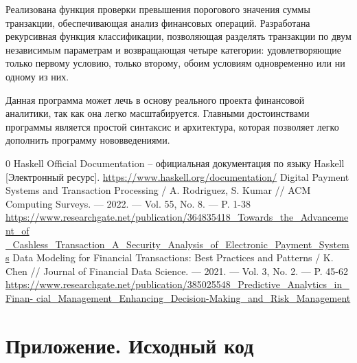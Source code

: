 \documentclass[a4paper, final]{article}
\begin{document}
	Реализована функция проверки превышения порогового значения суммы транзакции, обеспечивающая анализ финансовых операций. Разработана рекурсивная функция классификации, позволяющая разделять транзакции по двум независимым параметрам и возвращающая четыре категории: удовлетворяющие только первому условию, только второму, обоим условиям одновременно или ни одному из них.
	
	Данная программа может лечь в основу реального проекта финансовой аналитики, так как она легко масштабируется. Главными достоинствами программы является простой синтаксис и архитектура, которая позволяет легко дополнить  программу нововведениями.
	
	
	\newpage
	
	\vspace{-1.5cm}
	\begin{thebibliography}{0}
		Haskell Official Documentation -- официальная документация по языку Haskell [Электронный ресурс]. 	 
		\href {https://www.haskell.org/documentation/}{https://www.haskell.org/documentation/}
		Digital Payment Systems and Transaction Processing / A. Rodriguez, S. Kumar // ACM Computing Surveys. — 2022. — Vol. 55, No. 8. — P. 1-38
		\href {https://www.researchgate.net/publication/364835418_Towards_the_Advancement_of_Cashless_Transaction_A_Security_Analysis_of_Electronic_Payment_Systems}{https://www.researchgate.net/publication/364835418\_Towards\_the\_Advancement\_of
		\_Cashless\_Transaction\_A\_Security\_Analysis\_of\_Electronic\_Payment\_Systems}
		Data Modeling for Financial Transactions: Best Practices and Patterns / K. Chen // Journal of Financial Data Science. — 2021. — Vol. 3, No. 2. — P. 45-62	 
		\href {https://www.researchgate.net/publication/385025548_Predictive_Analytics_in_Financial_Management_Enhancing_Decision-Making_and_Risk_Management}{https://www.researchgate.net/publication/385025548\_Predictive\_Analytics\_in\_Finan-
		cial\_Management\_Enhancing\_Decision-Making\_and\_Risk\_Management}
		
	\end{thebibliography}
	
	\newpage
	\section*{Приложение. Исходный код}
	
\end{document}

